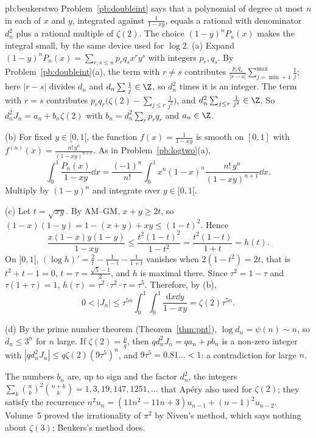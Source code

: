 \begin{solution}{pb:beukerstwo}
\idea Problem~\ref{pb:doubleint} says that a polynomial of degree at most $n$ in each of $x$ and $y$, integrated against $\frac1{1-xy}$, equals a rational with denominator $d_n^2$ plus a rational multiple of $\zeta(2)$. The choice $(1-y)^nP_n(x)$ makes the integral small, by the same device used for $\log2$.
\writeup (a) Expand $(1-y)^nP_n(x)=\sum_{r,s\le n}p_rq_sx^ry^s$ with integers $p_r,q_s$. By Problem~\ref{pb:doubleint}(a), the term with $r\ne s$
contributes $\frac{p_rq_s}{|r-s|}\sum_{j=\min+1}^{\max}\frac1j$; here $|r-s|$ divides $d_n$ and $d_n\sum\frac1j\in\Z$, so $d_n^2$ times it is an
integer. The term with $r=s$ contributes $p_rq_r\bigl(\zeta(2)-\sum_{j\le r}\frac1{j^2}\bigr)$, and $d_n^2\sum_{j\le r}\frac1{j^2}\in\Z$. So
$d_n^2J_n=a_n+b_n\zeta(2)$ with $b_n=d_n^2\sum_rp_rq_r$ and $a_n\in\Z$.

(b) For fixed $y\in[0,1[$, the function $f(x)=\frac1{1-xy}$ is smooth on $[0,1]$ with $f^{(n)}(x)=\frac{n!\,y^n}{(1-xy)^{n+1}}$. As in
Problem~\ref{pb:logtwo}(a),
\[
\int_0^1\frac{P_n(x)}{1-xy}\dd x=\frac{(-1)^n}{n!}\int_0^1x^n(1-x)^n\frac{n!\,y^n}{(1-xy)^{n+1}}\dd x.
\]
Multiply by $(1-y)^n$ and integrate over $y\in[0,1[$.

(c) Let $t=\sqrt{xy}$. By AM--GM, $x+y\ge2t$, so $(1-x)(1-y)=1-(x+y)+xy\le(1-t)^2$. Hence
\[
\frac{x(1-x)y(1-y)}{1-xy}\le\frac{t^2(1-t)^2}{1-t^2}=\frac{t^2(1-t)}{1+t}=h(t).
\]
On $]0,1[$, $(\log h)'=\frac2t-\frac1{1-t}-\frac1{1+t}$ vanishes when $2(1-t^2)=2t$, that is $t^2+t-1=0$, $t=\tau=\frac{\sqrt5-1}2$, and $h$
is maximal there. Since $\tau^2=1-\tau$ and $\tau(1+\tau)=1$, $h(\tau)=\tau^2\cdot\tau^2\cdot\tau=\tau^5$. Therefore, by (b),
\[
0<|J_n|\le\tau^{5n}\int_0^1\!\!\int_0^1\frac{\mathrm dx\dd y}{1-xy}=\zeta(2)\tau^{5n}.
\]

(d) By the prime number theorem (Theorem~\ref{thm:pnt}), $\log d_n=\psi(n)\sim n$, so $d_n\le3^n$ for $n$ large. If $\zeta(2)=\frac pq$, then
$q d_n^2J_n=qa_n+pb_n$ is a non-zero integer with $|qd_n^2J_n|\le q\zeta(2)(9\tau^5)^n$, and $9\tau^5=0.81\ldots<1$: a contradiction for large $n$.

\leads The numbers $b_n$ are, up to sign and the factor $d_n^2$, the integers $\sum_k\binom nk^2\binom{n+k}k=1,3,19,147,1251,\dots$ that Apéry also
used for $\zeta(2)$; they satisfy the recurrence $n^2u_n=(11n^2-11n+3)u_{n-1}+(n-1)^2u_{n-2}$. Volume~5 proved the irrationality of
$\pi^2$ by Niven's method, which says nothing about $\zeta(3)$; Beukers's method does.
\end{solution}

